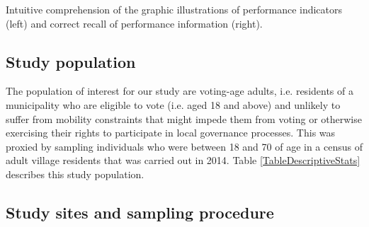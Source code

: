 \documentclass[11pt]{article}
\begin{document}
\begin{table}

\caption{Intuitive comprehension of the graphic illustrations of performance indicators (left) and correct recall of performance information (right). }
\label{TableComprehension}
\end{table}

\subsection{Study population}

The population of interest for our study are voting-age adults, i.e. residents of a municipality who are eligible to vote (i.e. aged 18 and above) and unlikely to suffer from mobility constraints that might impede them from voting or otherwise exercising their rights to participate in local governance processes. This was proxied by sampling individuals who were between 18 and 70 of age in a census of adult village residents that was carried out in 2014. Table \ref{TableDescriptiveStats} describes this study population. 

\begin{table}

\label{TableDescriptiveStats}
\end{table}

\subsection{Study sites and sampling procedure} 
\end{document}
